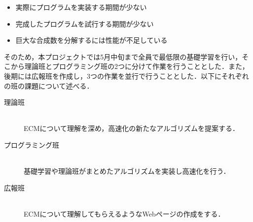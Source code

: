 \documentclass[openany,11pt,papersize]{jsbook}
\begin{document}
\begin{itemize}
\item 実際にプログラムを実装する期間が少ない
\item 完成したプログラムを試行する期間が少ない
\item 巨大な合成数を分解するには性能が不足している
\end{itemize}

そのため，本プロジェクトでは5月中旬まで全員で最低限の基礎学習を行い，そこから理論班とプログラミング班の2つに分けて作業を行うこととした．また，後期には広報班を作成し，3つの作業を並行で行うこととした．以下にそれぞれの班の課題について述べる．

\begin{description}
 \item[理論班]\mbox{}\\ 
	    ECMについて理解を深め，高速化の新たなアルゴリズムを提案する．
 \item[プログラミング班]\mbox{}\\
	    基礎学習や理論班がまとめたアルゴリズムを実装し高速化を行う．
 \item[広報班]\mbox{}\\
	    ECMについて理解してもらえるようなWebページの作成をする．
\end{description}
\end{document}
